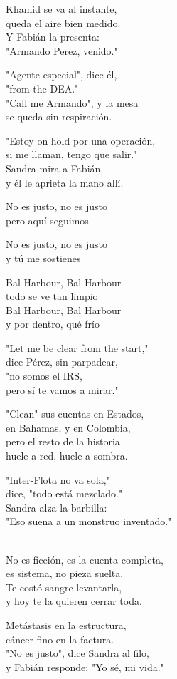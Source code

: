 \begin{lyrics}
Khamid se va al instante,\\
queda el aire bien medido.\\
Y Fabián la presenta:\\
"Armando Perez, venido."

"Agente especial", dice él,\\
"from the DEA."\\
"Call me Armando", y la mesa\\
se queda sin respiración.

"Estoy on hold por una operación,\\
si me llaman, tengo que salir."\\
Sandra mira a Fabián,\\
y él le aprieta la mano allí.

No es justo, no es justo\\
pero aquí seguimos

No es justo, no es justo\\
y tú me sostienes

Bal Harbour, Bal Harbour\\
todo se ve tan limpio\\
Bal Harbour, Bal Harbour\\
y por dentro, qué frío

"Let me be clear from the start,"\\
dice Pérez, sin parpadear,\\
"no somos el IRS,\\
pero sí te vamos a mirar."

"Clean" sus cuentas en Estados,\\
en Bahamas, y en Colombia,\\
pero el resto de la historia\\
huele a red, huele a sombra.

"Inter-Flota no va sola,"\\
dice, "todo está mezclado."\\
Sandra alza la barbilla:\\
"Eso suena a un monstruo inventado."

\\
No es ficción, es la cuenta completa,\\
es sistema, no pieza suelta.\\
Te costó sangre levantarla,\\
y hoy te la quieren cerrar toda.

Metástasis en la estructura,\\
cáncer fino en la factura.\\
"No es justo", dice Sandra al filo,\\
y Fabián responde: "Yo sé, mi vida."


\end{lyrics}
